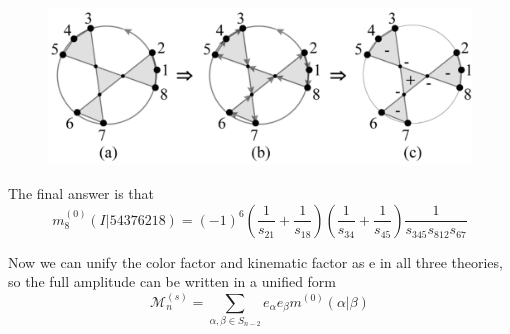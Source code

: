 \documentclass{beamer}
\begin{document}
\begin{frame}
    
    \begin{figure}
        \centering
        \includegraphics[width=1\linewidth]{6.png}
    \end{figure}
    The final answer is that
    \begin{equation*}
        m_8^{(0)}(I|54376218)=(-1)^6\left(\frac{1}{s_{21}}+\frac{1}{s_{18}}\right)\left(\frac{1}{s_{34}}+\frac{1}{s_{45}}\right)\frac{1}{s_{345}s_{812}s_{67}}
    \end{equation*}
\end{frame}
\begin{frame}
    Now we can unify the color factor and kinematic factor as e in all three theories, so the full amplitude can be written in a unified form
    \begin{equation*}
       \mathcal{M}_n^{(s)}=\sum_{\alpha,\beta\in S_{n-2}}e_\alpha e_\beta m^{(0)}(\alpha|\beta)
    \end{equation*}
\end{frame}
\end{document}
